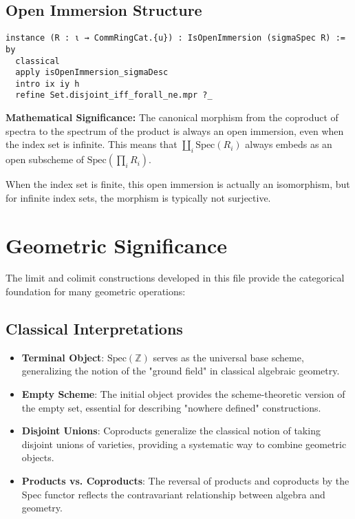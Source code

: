 \documentclass{article}
\theoremstyle{definition}
\begin{document}
\subsection{Open Immersion Structure}

\begin{lstlisting}
instance (R : ι → CommRingCat.{u}) : IsOpenImmersion (sigmaSpec R) := by
  classical
  apply isOpenImmersion_sigmaDesc
  intro ix iy h
  refine Set.disjoint_iff_forall_ne.mpr ?_
\end{lstlisting}

\textbf{Mathematical Significance:} The canonical morphism from the coproduct of spectra to the spectrum of the product is always an open immersion, even when the index set is infinite. This means that $\coprod_i \mathrm{Spec}(R_i)$ always embeds as an open subscheme of $\mathrm{Spec}(\prod_i R_i)$.

When the index set is finite, this open immersion is actually an isomorphism, but for infinite index sets, the morphism is typically not surjective.

\section{Geometric Significance}

The limit and colimit constructions developed in this file provide the categorical foundation for many geometric operations:

\subsection{Classical Interpretations}

\begin{itemize}
\item \textbf{Terminal Object}: $\mathrm{Spec}(\mathbb{Z})$ serves as the universal base scheme, generalizing the notion of the "ground field" in classical algebraic geometry.

\item \textbf{Empty Scheme}: The initial object provides the scheme-theoretic version of the empty set, essential for describing "nowhere defined" constructions.

\item \textbf{Disjoint Unions}: Coproducts generalize the classical notion of taking disjoint unions of varieties, providing a systematic way to combine geometric objects.

\item \textbf{Products vs. Coproducts}: The reversal of products and coproducts by the Spec functor reflects the contravariant relationship between algebra and geometry.
\end{itemize}
\end{document}
